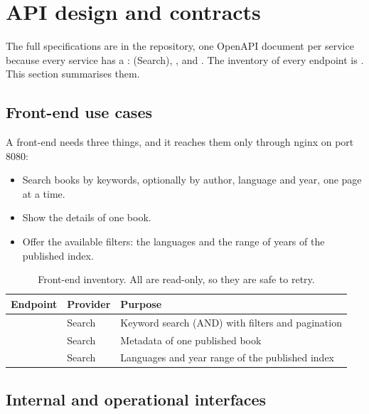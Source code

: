 \section{API design and contracts}
\label{sec:api}

The full specifications are in the repository, one OpenAPI document per service because every service has
a :  (Search), ,
 and . The inventory of every endpoint is
. This section summarises them.

\subsection{Front-end use cases}

A front-end needs three things, and it reaches them only through nginx on port 8080:

\begin{itemize}
  \item Search books by keywords, optionally by author, language and year, one page at a time.
  \item Show the details of one book.
  \item Offer the available filters: the languages and the range of years of the published index.
\end{itemize}

\begin{table}[H]
\centering\small
\begin{tabularx}{\linewidth}{@{}L{4.6cm}L{1.6cm}X@{}}
\toprule
\textbf{Endpoint} & \textbf{Provider} & \textbf{Purpose} \\
\midrule
{} & Search & Keyword search (AND) with filters and pagination \\
 & Search & Metadata of one published book \\
 & Search & Languages and year range of the published index \\
\bottomrule
\end{tabularx}
\caption{Front-end inventory. All are read-only, so they are safe to retry.}
\end{table}

\subsection{Internal and operational interfaces}


